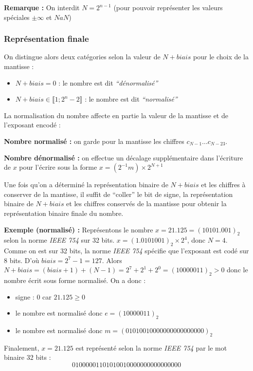 \documentclass[../../main.tex]{subfiles}
\begin{document}
\textbf{Remarque :} On interdit $N = 2^{n-1}$ (pour pouvoir représenter les valeurs spéciales $\pm\infty$ et $NaN$)

\subsubsection{Représentation finale}
On distingue alors deux catégories selon la valeur de $N + biais$ pour le choix de la mantisse :
\begin{itemize}
     \item $N + biais = 0$ : le nombre est dit \textit{``dénormalisé''}
     \item $N + biais \in{\llbracket{1; 2^{n}-2\rrbracket}}$ : le nombre est dit \textit{``normalisé''}
\end{itemize}
La normalisation du nombre affecte en partie la valeur de la mantisse et de l'exposant encodé :

\textbf{Nombre normalisé :} on garde pour la mantisse les chiffres $c_{N-1}\dots c_{N-23}$.

\textbf{Nombre dénormalisé :} on effectue un décalage supplémentaire dans l'écriture de $x$ pour l'écrire sous la forme $x = (2^{-1}m)\times{2^{N + 1}}$

Une fois qu'on a déterminé la représentation binaire de $N + biais$ et les chiffres à conserver de la mantisse, il suffit de ``coller'' le bit de signe, la représentation binaire de $N + biais$ et les chiffres conservés de la mantisse pour obtenir la représentation binaire finale du nombre.

\textbf{Exemple (normalisé) : } Représentons le nombre $x = 21.125 = (10101.001)_{2}$ selon la norme \textit{IEEE 754} sur 32 bits. \newline
$x = (1.0101001)_{2}\times{2^{4}}$, donc $N = 4$. Comme on est sur 32 bits, la norme \textit{IEEE 754} spécifie que l'exposant est codé sur 8 bits. D'où $biais = 2^{7}-1 = 127$. Alors $N + biais =  (biais + 1) + (N-1) = 2^{7} + 2^{1} + 2^{0} = (10000011)_{2} > 0$ donc le nombre écrit sous forme normalisé. On a donc :
\begin{itemize}
     \item signe : 0 car $21.125 \geq 0$
     \item le nombre est normalisé donc $e = (10000011)_{2}$
     \item le nombre est normalisé donc $m = (01010010000000000000000)_{2}$
\end{itemize}
Finalement, $x = 21.125$ est représenté selon la norme \textit{IEEE 754} par le mot binaire 32 bits : $$01000001101010010000000000000000$$
\end{document}
